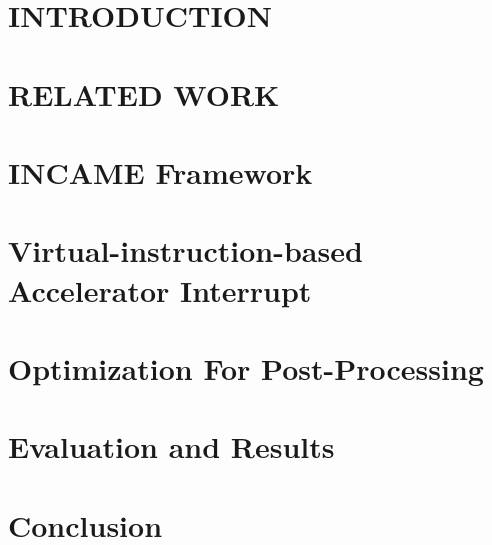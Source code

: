 \documentclass[journal]{IEEEtran}
\begin{document}






%
\IEEEpeerreviewmaketitle


\section{INTRODUCTION}


\section{RELATED WORK}


\section{INCAME Framework}


\section{Virtual-instruction-based Accelerator Interrupt}


\section{Optimization For Post-Processing }


\section{Evaluation and Results}


\section{Conclusion}

\end{document}
